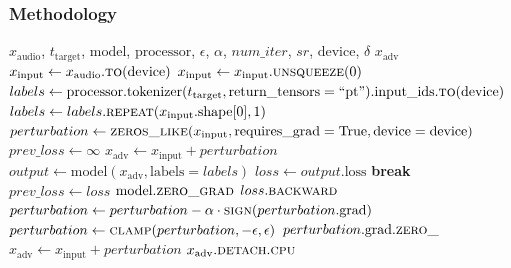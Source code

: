 \documentclass[a4paper,12pt]{article}
\begin{document}
\subsubsection{Methodology}
\begin{algorithm}[H]
\caption{Projected Gradient Descent (PGD) Attack}
\begin{algorithmic}[1]
\Require $x_{\text{audio}}$, $t_{\text{target}}$, $\text{model}$, $\text{processor}$, $\epsilon$, $\alpha$, $num\_iter$, $sr$, $\text{device}$, $\delta$ 
\Ensure $x_{\text{adv}}$ 
\State $x_{\text{input}} \gets x_{\text{audio}}.\Call{to}{\text{device}}$ 
    \State $x_{\text{input}} \gets x_{\text{input}}.\Call{unsqueeze}{0}$ 
\EndIf
\State $labels \gets \text{processor}.\text{tokenizer}(t_{\text{target}}, \text{return\_tensors}=\text{``pt''}).\text{input\_ids}.\Call{to}{\text{device}}$ 
\State $labels \gets labels.\Call{repeat}{x_{\text{input}}.\text{shape}[0], 1}$ 
\State $perturbation \gets \Call{zeros\_like}{x_{\text{input}}, \text{requires\_grad}=\text{True}, \text{device}=\text{device}}$ 
\State $prev\_loss \gets \infty$ 
 
    \State $x_{\text{adv}} \gets x_{\text{input}} + perturbation$ 
    \State $output \gets \text{model}(x_{\text{adv}}, \text{labels}=labels)$ 
    \State $loss \gets output.\text{loss}$ 
     
        \State \textbf{break} 
    \EndIf
    \State $prev\_loss \gets loss$ 
    \State $\text{model}.\Call{zero\_grad}{}$ 
    \State $loss.\Call{backward}{}$ 
    \State {}
    \State {}
    \State $perturbation \gets perturbation - \alpha \cdot \Call{sign}{perturbation.\text{grad}}$ 
    \State $perturbation \gets \Call{clamp}{perturbation, -\epsilon, \epsilon}$ 
    \State {}
    \State $perturbation.\text{grad}.\Call{zero\_}{}$ 
\EndFor
\State $x_{\text{adv}} \gets x_{\text{input}} + perturbation$ 
\State \Return $x_{\text{adv}}.\Call{detach}{}.\Call{cpu}{}$ 
\end{algorithmic}
\end{algorithm}
\end{document}
